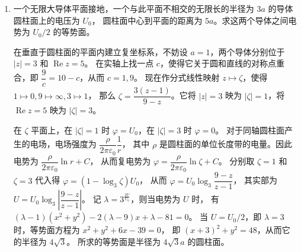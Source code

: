 \begin{enumerate}
由于我们已在 $P$ 点取法坐标，在 $P$ 点相应的联络系数为
\begin{align*}
& \widetilde{\Gamma}_{j k}^{i}=0 \quad(i, j, k=u, v), \\
& \widetilde{\Gamma}_{u \varepsilon}^{u}=L, \quad \widetilde{\Gamma}_{v \varepsilon}^{u}=\widetilde{\Gamma}_{u \varepsilon}^{v}=M, \quad \widetilde{\Gamma}_{v \varepsilon}^{v}=N, \\
& \widetilde{\Gamma}_{u u}^{\varepsilon}=-L, \quad \widetilde{\Gamma}_{u v}^{\varepsilon}=\widetilde{\Gamma}_{v u}^{\varepsilon}=-M, \quad \widetilde{\Gamma}_{v v}^{\varepsilon}=-N, \\
& \widetilde{\Gamma}_{\varepsilon k}^{\varepsilon}=\widetilde{\Gamma}_{\varepsilon \varepsilon}^{k}=0 \quad(k=u, v, \varepsilon).
\end{align*}
在导体外，电场强度 $\boldsymbol{E}$ 的散度为零，记
$$\boldsymbol{E}=E^{u} \widetilde{\boldsymbol{r}}_{u}+E^{v} \widetilde{\boldsymbol{r}}_{v}+E^{\varepsilon} \widetilde{\boldsymbol{r}}_{\varepsilon},$$
则 $\boldsymbol{E}$ 的散度
$$E_{;i}^{i}=\partial_{i} E^{i}+\widetilde{\Gamma}_{ij}^{i} E^{j}=0,$$
这里下标 ${ }_{;i}$ 表示对 $x_{i}$ 的共变导数。在 $P$ 点，成立
\[E^{u}=E^{v}=0, \quad 
\partial_{u} E^{u}=\partial_{v} E^{u}=\partial_{u} E^{v}=\partial_{v} E^{v}=0,\]
所以 $\boldsymbol{E}$ 的散度为零的方程成为
$$\partial_{\varepsilon} E^{\varepsilon}+LE^{\varepsilon}+NE^{\varepsilon}=0,$$
又由于在 $P$ 点 $\boldsymbol{E}$ 只有法向分量，且方向导数 $\dfrac{\partial}{\partial \varepsilon}=\dfrac{\partial}{\partial n}$，所以有
$$\frac{\partial \boldsymbol{E}}{\partial n}=-(L+N)\boldsymbol{E}.$$
对于法坐标，平均曲率 $H=(L+N)/2$，所以
$$\frac{\partial \boldsymbol{E}}{\partial n}=-2H\boldsymbol{E}.$$

\item 一个无限大导体平面接地，一个与此平面不相交的无限长的半径为 $3a$ 的导体圆柱面上的电压为 $U_0$，
圆柱面中心到平面的距离为 $5a$。求这两个导体之间电势为 $U_0/2$ 的等势面。

在垂直于圆柱面的平面内建立复坐标系，不妨设 $a=1$，两个导体分别位于 $|z|=3$ 和 $\operatorname{Re} z=5$。
在实轴上找一点 $c$，使得它关于圆和直线的对称点重合，即 $\dfrac{9}{c}=10-c$，从而 $c=1,9$。
现在作分式线性映射 $z \mapsto \zeta$，使得 $1 \mapsto 0, 9 \mapsto \infty, 3 \mapsto 1$，
那么 $\zeta=\dfrac{3(z-1)}{9-z}$。它将 $|z|=3$ 映为 $|\zeta|=1$，将 $\operatorname{Re} z=5$ 映为 $|\zeta|=3$。

在 $\zeta$ 平面上，在 $|\zeta|=1$ 时 $\varphi=U_{0}$，在 $|\zeta|=3$ 时 $\varphi=0$。
对于同轴圆柱面产生的电场，电场强度为 $\dfrac{\rho}{2\pi\varepsilon_{0}} \dfrac{1}{r}$，
其中 $\rho$ 是圆柱面的单位长度带的电量。因此电势为 $\dfrac{\rho}{2\pi\varepsilon_{0}} \ln r+C$，
从而复电势为 $\varphi=\dfrac{\rho}{2\pi\varepsilon_{0}} \ln \zeta+C$。
分别取 $\zeta=1$ 和 $\zeta=3$ 代入得 $\varphi=\left(1-\log_{3}\zeta\right) U_{0}$，
从而 $\varphi=U_{0} \log_{3} \dfrac{9-z}{z-1}$，
其实部为 $U=U_{0} \log_{3}\left|\dfrac{9-z}{z-1}\right|$。
记 $\lambda=3^{\frac{2U}{U_{0}}}$，则当电势为 $U$ 时，
有 $(\lambda-1)(x^{2}+y^{2})-2(\lambda-9) x+\lambda-81=0$。
当 $U=U_{0}/2$，即 $\lambda=3$ 时，等势面方程为 $x^{2}+y^{2}+6x-39=0$，
即 $(x+3)^{2}+y^{2}=48$，从而它的半径为 $4\sqrt{3}$。
所求的等势面是半径为 $4\sqrt{3}a$ 的圆柱面。


\end{enumerate}
